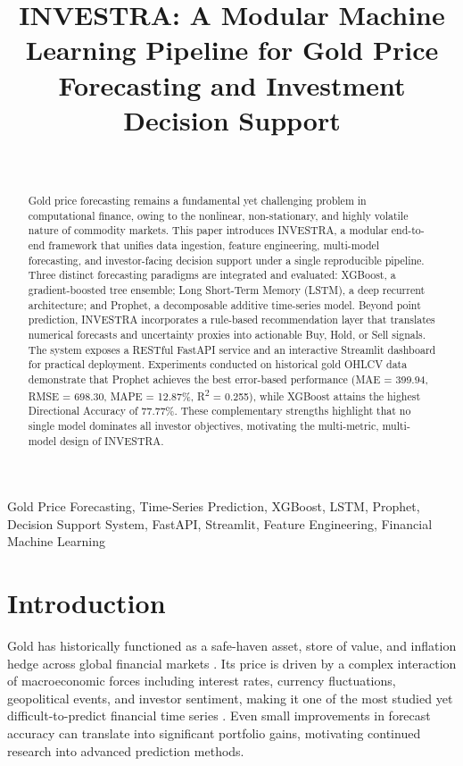 \documentclass[journal,comsoc]{IEEEtran}
\title{INVESTRA: A Modular Machine Learning Pipeline for Gold
Price Forecasting and Investment Decision Support}
\author{
\IEEEauthorblockN{Rakibul Islam Asif, Md Emon Biswas, Md Rafiu Islam, Md Siyam Shanto, Md Mehedi Hasan Rafi}\\
\IEEEauthorblockA{
Department of Computer Science and Engineering\\
Bangladesh University Of Business and Technology\\
Dhaka, Bangladesh
}
}
\begin{document}
\maketitle

\begin{abstract}
Gold price forecasting remains a fundamental yet challenging problem in computational finance, owing to the nonlinear, non-stationary, and highly volatile nature of commodity markets. This paper introduces INVESTRA, a modular end-to-end framework that unifies data ingestion, feature engineering, multi-model forecasting, and investor-facing decision support under a single reproducible pipeline. Three distinct forecasting paradigms are integrated and evaluated: XGBoost, a gradient-boosted tree ensemble; Long Short-Term Memory (LSTM), a deep recurrent architecture; and Prophet, a decomposable additive time-series model. Beyond point prediction, INVESTRA incorporates a rule-based recommendation layer that translates numerical forecasts and uncertainty proxies into actionable Buy, Hold, or Sell signals. The system exposes a RESTful FastAPI service and an interactive Streamlit dashboard for practical deployment. Experiments conducted on historical gold OHLCV data demonstrate that Prophet achieves the best error-based performance (MAE = 399.94, RMSE = 698.30, MAPE = 12.87\%, R\textsuperscript{2} = 0.255), while XGBoost attains the highest Directional Accuracy of 77.77\%. These complementary strengths highlight that no single model dominates all investor objectives, motivating the multi-metric, multi-model design of INVESTRA.
\end{abstract}

\begin{IEEEkeywords}
Gold Price Forecasting, Time-Series Prediction, XGBoost, LSTM, Prophet, Decision Support System, FastAPI, Streamlit, Feature Engineering, Financial Machine Learning
\end{IEEEkeywords}

\section{Introduction}
\label{sec:introduction}
 Gold has historically functioned as a safe-haven asset, store of value, and inflation hedge across global financial markets \cite{bollerslev1986generalized}. Its price is driven by a complex interaction of macroeconomic forces including interest rates, currency fluctuations, geopolitical events, and investor sentiment, making it one of the most studied yet difficult-to-predict financial time series \cite{friedman2001greedy}. Even small improvements in forecast accuracy can translate into significant portfolio gains, motivating continued research into advanced prediction methods.
\end{document}
